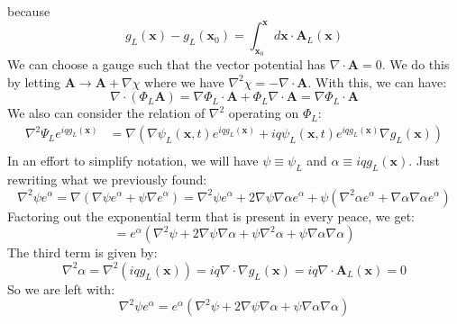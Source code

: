 \documentclass[12pt]{article}
\begin{document}
because
\begin{equation}
  g_L(\mathbf{x}) - g_L(\mathbf{x}_0) = \int_{\mathbf{x}_0}^{\mathbf{x}} d \mathbf{x} \cdot \mathbf{A}_L(\mathbf{x})
\end{equation}
We can choose a gauge such that the vector potential has $\nabla \cdot \mathbf{A} = 0$. We do this by letting $\mathbf{A} \rightarrow \mathbf{A} + \nabla \chi$ where we have $\nabla^2 \chi = -\nabla \cdot \mathbf{A}$. With this, we can have:
\begin{equation}
  \nabla \cdot (\Phi_L \mathbf{A}) = \nabla \Phi_L \cdot \mathbf{A} + \Phi_L \nabla \cdot \mathbf{A} = \nabla \Phi_L \cdot \mathbf{A}
\end{equation}
We also can consider the relation of $\nabla^2$ operating on $\Phi _L$:
\begin{equation}
\begin{aligned}
  \nabla^2 \Psi_L e^{i q g_L(\mathbf{x})} &= \nabla(\nabla \psi_{L}(\mathbf{x}, t) e^{i q g_{L}(\mathbf{x})} + iq\psi_{L}(\mathbf{x}, t) e^{i q g_{L}(\mathbf{x})} \nabla g_{L}(\mathbf{x}))\\
\end{aligned}
\end{equation}
In an effort to simplify notation, we will have $\psi  \equiv \psi_L $ and $\alpha \equiv i q g_L(\mathbf{x})$.
Just rewriting what we previously found:
\begin{equation}
  \nabla^2 \psi e^{\alpha} = \nabla(\nabla \psi e^{\alpha} + \psi \nabla e^{\alpha}) = \nabla^2 \psi e^{\alpha} + 2 \nabla\psi \nabla\alpha e^{\alpha} + \psi (\nabla^2 \alpha e^{\alpha} + \nabla \alpha \nabla \alpha e^{\alpha}) 
\end{equation}
Factoring out the exponential term that is present in every peace, we get:
\begin{equation}
  = e^{\alpha} \left( \nabla^2 \psi + 2 \nabla \psi \nabla \alpha + \psi \nabla^2 \alpha + \psi \nabla \alpha \nabla \alpha \right)
\end{equation}
The third term is given by:
\begin{equation}
  \nabla^2 \alpha = \nabla^2 (i q g_L(\mathbf{x})) = i q \nabla \cdot \nabla g_L(\mathbf{x}) = i q \nabla \cdot \mathbf{A}_L(\mathbf{x}) = 0
\end{equation}
So we are left with:
\begin{equation}
  \nabla^2 \psi e^{\alpha} = e^{\alpha} \left( \nabla^2 \psi + 2 \nabla \psi \nabla \alpha + \psi \nabla \alpha \nabla \alpha \right)
\end{equation}
\end{document}
